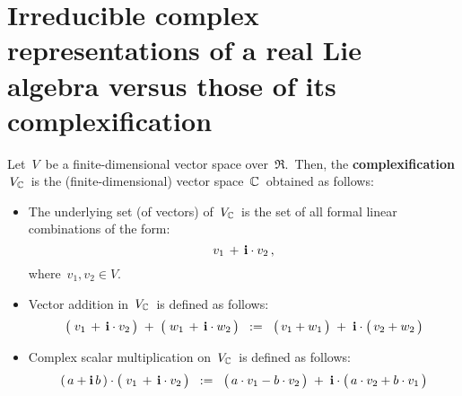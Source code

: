 

\section{Irreducible complex representations of a real Lie algebra versus those of its complexification}
\setcounter{theorem}{0}
\setcounter{equation}{0}


\renewcommand{\theenumi}{\roman{enumi}}
\renewcommand{\labelenumi}{\textnormal{(\theenumi)}$\;\;$}


\begin{definition}
\mbox{}
\vskip 0.05cm
\noindent
Let \,$V$\, be a finite-dimensional vector space over \,$\Re$.\,
Then, the \textbf{complexification} \,$V_{\mathbb{C}}$\, is
the (finite-dimensional) vector space \,$\mathbb{C}$\, obtained as follows:
\begin{itemize}
\item
	The underlying set (of vectors) of \,$V_{\mathbb{C}}$\, is the set of all formal linear combinations
	of the form:
	\begin{equation*}
	v_{1} \, + \, \textnormal{\bf i}\cdot v_{2}\,,
	\end{equation*}
	where \,$v_{1}, v_{2} \in V$.\,
\item
	Vector addition in \,$V_{\mathbb{C}}$\, is defined as follows:
	\begin{equation*}
	\left(\;\overset{{\color{white}.}}{v_{1}} \, + \, \i\cdot v_{2}\,\right)
	\; + \;
	\left(\;\overset{{\color{white}.}}{w_{1}} \, + \, \i\cdot w_{2}\,\right)
	\;\; := \;\;
		\left(\,\overset{{\color{white}.}}{v_{1}} + w_{1} \,\right)
		\; + \;
		\i\cdot\left(\,\overset{{\color{white}.}}{v_{2}} + w_{2} \,\right)
	\end{equation*}	
\item
	Complex scalar multiplication on \,$V_{\mathbb{C}}$\, is defined as follows:
	\begin{equation*}
	(\,a + \i \, b\,) \cdot \left(\;\overset{{\color{white}.}}{v_{1}} \, + \, \i\cdot v_{2}\,\right)
	\;\; := \;\;
		\left(\,a\cdot\overset{{\color{white}.}}{v_{1}} - b \cdot v_{2} \,\right)
		\; + \;
		\i\cdot\left(\,a\cdot\overset{{\color{white}.}}{v_{2}} + b \cdot v_{1} \,\right)
	\end{equation*}	
\end{itemize}
\end{definition}

